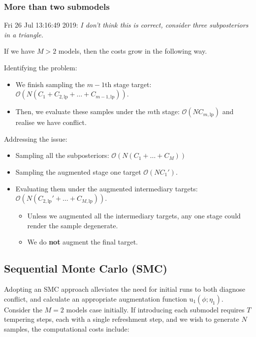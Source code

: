 \documentclass[10pt,a4paper,]{article}
\providecommand{\tightlist}{%
  \setlength{\itemsep}{0pt}\setlength{\parskip}{0pt}}
\newcommand{\tarw}{\text{u}}
\newcommand{\Nx}{N}
\newcommand{\Nm}{M}
\newcommand{\modelindex}{m}
\begin{document}
\subsubsection*{More than two submodels}\label{more-than-two-submodels}

Fri 26 Jul 13:16:49 2019: \emph{I don't think this is correct, consider
three subposteriors in a triangle.}

If we have \(\Nm > 2\) models, then the costs grow in the following way.

Identifying the problem:

\begin{itemize}
\tightlist
\item
  We finish sampling the \(\modelindex-1\)th stage target:
  \(\mathcal{O}(\Nx (C_{1} + C_{2, \text{lp}} + \ldots + C_{\modelindex - 1, \text{lp}}))\).
\item
  Then, we evaluate these samples under the \(\modelindex\)th stage:
  \(\mathcal{O}(\Nx C_{\modelindex, \text{lp}})\) and realise we have
  conflict.
\end{itemize}

Addressing the issue:

\begin{itemize}
\tightlist
\item
  Sampling all the subposteriors:
  \(\mathcal{O}(\Nx (C_{1} + \ldots + C_{\Nm}))\)
\item
  Sampling the augmented stage one target \(\mathcal{O}(\Nx C_{1}')\).
\item
  Evaluating them under the augmented intermediary targets:
  \(\mathcal{O}(\Nx (C_{2, \text{lp}}' + \ldots + C_{\Nm, \text{lp}}))\).

  \begin{itemize}
  \tightlist
  \item
    Unless we augmented all the intermediary targets, any one stage
    could render the sample degenerate.
  \item
    We do \textbf{not} augment the final target.
  \end{itemize}
\end{itemize}

\subsection{Sequential Monte Carlo
(SMC)}\label{sequential-monte-carlo-smc}

Adopting an SMC approach alleviates the need for initial runs to both
diagnose conflict, and calculate an appropriate augmentation function
\(\tarw_{1}(\phi; \eta_{1})\). Consider the \(\Nm = 2\) models case
initially. If introducing each submodel requires \(T\) tempering steps,
each with a single refreshment step, and we wish to generate \(\Nx\)
samples, the computational costs include:
\end{document}
